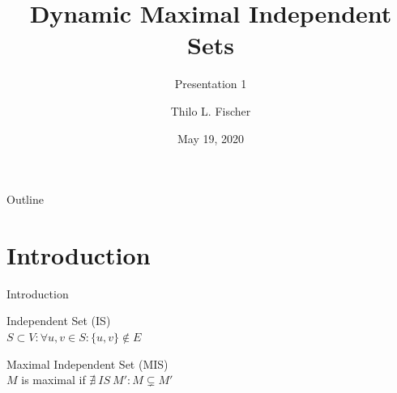 \documentclass{beamer}
\title[ShortTitle]{Dynamic Maximal Independent Sets}
\subtitle{Presentation 1}
\author{Thilo L. Fischer}
\date{May 19, 2020}
\begin{document}
\begin{frame}
  \titlepage
\end{frame}

\begin{frame}{Outline}
  \tableofcontents
\end{frame}

\section{Introduction}
\begin{frame}{Introduction}

  \begin{definition}{Independent Set (IS)}
  \\
    $S \subset V: \forall u, v \in S: \{u, v\} \notin E$
  \end{definition}


  \begin{definition}{Maximal Independent Set (MIS)}
  \\
    $M$ is maximal if $\nexists \  IS \ M': M \subsetneq M'$
  \end{definition}

\end{frame}
\end{document}
